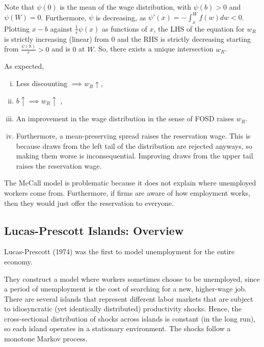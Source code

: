 \documentclass{tufte-handout}
\theoremstyle{definition}
\begin{document}
Note that $\psi(0) $ is the mean of the wage distribution, with $\psi(b) > 0$ and $\psi (W) = 0$. Furthermore, $\psi$ is decreasing, as $\psi'(x) = - \int_{x}^{W} f(w)dw < 0 $.
Plotting $x-b$ against $\frac{1}{r}\psi(x)$ as functions of $x$, the LHS of the equation for $w_R$ is strictly increasing (linear) from $0$ and the RHS is strictly decreasing starting from $\frac{\psi(b)}{r} > 0$ and is $0$ at $W$. So, there exists a unique intersection $w_R$.

As expected,
\begin{enumerate}[(i)]
	\item Less discounting $\implies w_R \uparrow$,
	\item $b \uparrow \implies w_R \uparrow$ ,
	\item An improvement in the wage distribution in the sense of FOSD raises $w_R$.
	\item Furthermore, a mean-preserving spread raises the reservation wage. This is because draws from the left tail of the distribution are rejected anyways, so making them worse is inconsequential. Improving draws from the upper tail raises the reservation wage.
\end{enumerate}

The McCall model is problematic because it does not explain where unemployed workers come from. Furthermore, if firms are aware of how employment works, then they would just offer the reservation to everyone.

\subsection{Lucas-Prescott Islands: Overview}

Lucas-Prescott (1974) was the first to model unemployment for the entire economy.

They construct a model where workers sometimes choose to be unemployed, since a period of unemployment is the cost of searching for a new, higher-wage job. There are several islands that represent different labor markets that are subject to idiosyncratic (yet identically distributed) productivity shocks. Hence, the cross-sectional distribution of shocks across islands is constant (in the long run), so each island operates in a stationary environment. The shocks follow a monotone Markov process.
\end{document}
